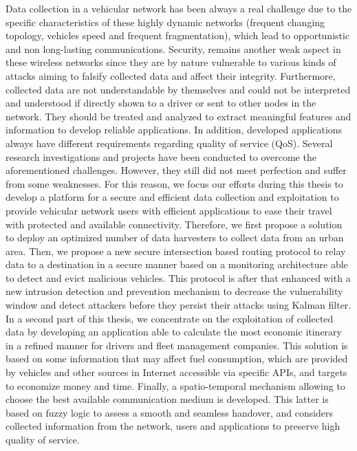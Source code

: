 Data collection in a vehicular network has been always a real challenge due to the specific characteristics of these highly dynamic networks (frequent changing topology,
	vehicles speed and frequent fragmentation),
	which lead to opportunistic and non long-lasting communications.
Security,
	remains another weak aspect in these wireless networks since they are by nature vulnerable to various kinds of attacks aiming to falsify collected data and affect their integrity.
Furthermore,
	collected data are not understandable by themselves and could not be interpreted and understood if directly shown to a driver or sent to other nodes in the network.
They should be treated and analyzed to extract meaningful features and information to develop reliable applications.
In addition,
	developed applications always have different requirements regarding quality of service (QoS).
Several research investigations and projects have been conducted to overcome the aforementioned challenges.
However,
	they still did not meet perfection and suffer from some weaknesses.
For this reason,
	we focus our efforts during this thesis to develop a platform for a secure and efficient data collection and exploitation to provide vehicular network users with efficient applications to ease their travel with protected and available connectivity.
Therefore,
	we first propose a solution to deploy an optimized number of data harvesters to collect data from an urban area.
Then,
	we propose a new secure intersection based routing protocol to relay data to a destination in a secure manner based on a monitoring architecture able to detect and evict malicious vehicles.
This protocol is after that enhanced with a new intrusion detection and prevention mechanism to decrease the vulnerability window and detect attackers before they persist their attacks using Kalman filter.
In a second part of this thesis,
	we concentrate on the exploitation of collected data by developing an application able to calculate the most economic itinerary in a refined manner for drivers and fleet management companies.
This solution is based on some information that may affect fuel consumption,
	which are provided by vehicles and other sources in Internet accessible via specific APIs,
	and targets to economize money and time.
Finally,
	a spatio-temporal mechanism allowing to choose the best available communication medium is developed.
This latter is based on fuzzy logic to assess a smooth and seamless handover,
	and considers collected information from the network,
	users and applications to preserve high quality of service.



